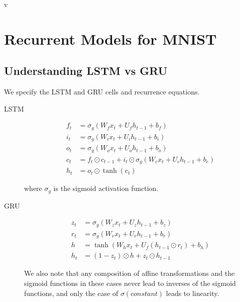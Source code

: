 \documentclass{article}
\begin{document}
v
\maketitle

\newpage

\tableofcontents

\newpage

\section{Recurrent Models for MNIST}

\subsection{Understanding LSTM vs GRU}

We specify the LSTM and GRU cells and recurrence equations.

\begin{description}
\item[LSTM]

  \begin{align}
    f_t & = \sigma_g (W_f x_t + U_f h_{t-1} + b_f) \\
    i_t & = \sigma_g (W_i x_t + U_i h_{t-1} + b_i) \\
    o_t & = \sigma_g (W_o x_t + U_o h_{t-1} + b_o) \\
    c_t & = f_t \odot c_{t-1} + i_t \odot \sigma_g(W_c x_t + U_c h_{t-1} + b_c) \\
    h_t & = o_t \odot \tanh (c_t)
  \end{align}

  where $\sigma_g$ is the sigmoid activation function.
  
\item[GRU]

  \begin{align}
    z_t & = \sigma_g (W_z x_t + U_z h_{t-1} + b_z) \\
    r_t & = \sigma_g (W_r x_t + U_r h_{t-1} + b_r) \\
    h & = \tanh(W_h x_t + U_f (h_{t-1} \odot r_t) + b_h) \\
    h_t & = (1 - z_t) \odot h + z_t \odot h_{t-1}
  \end{align}

  We also note that any composition of affine transformations and the sigmoid
  functions in these cases never lead to inverses of the sigmoid functions, and only the case
  of $\sigma(constant)$ leads to linearity.
    
\end{description}
\end{document}
